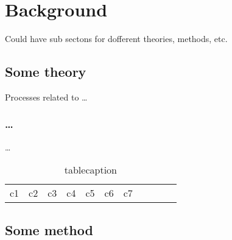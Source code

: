 \chapter{Background}
\label{chap:thisstudy}

Could have sub sectons for dofferent theories, methods, etc. 
\section{Some theory}
Processes related to \ldots
\subsection{\ldots}
\ldots 


\begin{table}[!htbp]\centering
\def\arraystretch{1.3}
\caption{tablecaption}
\vspace{5pt}
    \small
\setlength{\tabcolsep}{4pt}
\begin{tabular}{lcrccccccll}
\hline
 c1 & c2 & c3 & c4 & c5 & c6 & c7 \\
\end{tabular}
\label{Tab:1}
\end{table}
\normalsize

\section{Some method}


